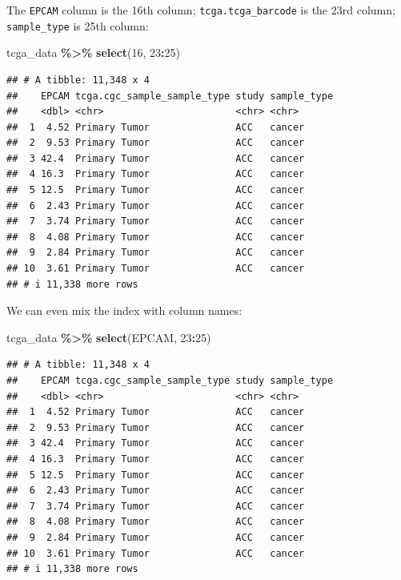\documentclass[
]{book}
\newenvironment{Shaded}{\begin{snugshade}}{\end{snugshade}}
\newcommand{\DecValTok}[1]{\textcolor[rgb]{0.00,0.00,0.81}{#1}}
\newcommand{\FunctionTok}[1]{\textcolor[rgb]{0.13,0.29,0.53}{\textbf{#1}}}
\newcommand{\NormalTok}[1]{#1}
\newcommand{\SpecialCharTok}[1]{\textcolor[rgb]{0.81,0.36,0.00}{\textbf{#1}}}
\begin{document}
The \texttt{EPCAM} column is the 16th column; \texttt{tcga.tcga\_barcode} is the 23rd column;
\texttt{sample\_type} is 25th column:

\begin{Shaded}
\begin{Highlighting}[]
\NormalTok{tcga\_data }\SpecialCharTok{\%\textgreater{}\%}
  \FunctionTok{select}\NormalTok{(}\DecValTok{16}\NormalTok{, }\DecValTok{23}\SpecialCharTok{:}\DecValTok{25}\NormalTok{)}
\end{Highlighting}
\end{Shaded}

\begin{verbatim}
## # A tibble: 11,348 x 4
##    EPCAM tcga.cgc_sample_sample_type study sample_type
##    <dbl> <chr>                       <chr> <chr>      
##  1  4.52 Primary Tumor               ACC   cancer     
##  2  9.53 Primary Tumor               ACC   cancer     
##  3 42.4  Primary Tumor               ACC   cancer     
##  4 16.3  Primary Tumor               ACC   cancer     
##  5 12.5  Primary Tumor               ACC   cancer     
##  6  2.43 Primary Tumor               ACC   cancer     
##  7  3.74 Primary Tumor               ACC   cancer     
##  8  4.08 Primary Tumor               ACC   cancer     
##  9  2.84 Primary Tumor               ACC   cancer     
## 10  3.61 Primary Tumor               ACC   cancer     
## # i 11,338 more rows
\end{verbatim}

We can even mix the index with column names:

\begin{Shaded}
\begin{Highlighting}[]
\NormalTok{tcga\_data }\SpecialCharTok{\%\textgreater{}\%}
  \FunctionTok{select}\NormalTok{(EPCAM, }\DecValTok{23}\SpecialCharTok{:}\DecValTok{25}\NormalTok{)}
\end{Highlighting}
\end{Shaded}

\begin{verbatim}
## # A tibble: 11,348 x 4
##    EPCAM tcga.cgc_sample_sample_type study sample_type
##    <dbl> <chr>                       <chr> <chr>      
##  1  4.52 Primary Tumor               ACC   cancer     
##  2  9.53 Primary Tumor               ACC   cancer     
##  3 42.4  Primary Tumor               ACC   cancer     
##  4 16.3  Primary Tumor               ACC   cancer     
##  5 12.5  Primary Tumor               ACC   cancer     
##  6  2.43 Primary Tumor               ACC   cancer     
##  7  3.74 Primary Tumor               ACC   cancer     
##  8  4.08 Primary Tumor               ACC   cancer     
##  9  2.84 Primary Tumor               ACC   cancer     
## 10  3.61 Primary Tumor               ACC   cancer     
## # i 11,338 more rows
\end{verbatim}
\end{document}
